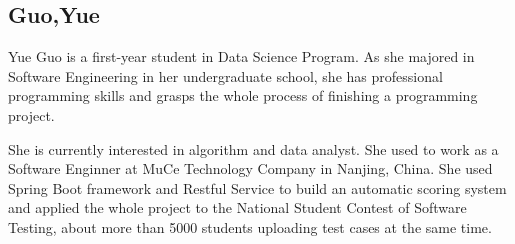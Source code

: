 \subsection{Guo,Yue}
Yue Guo is a first-year student in Data Science Program. As she majored in Software
Engineering in her undergraduate school, she has professional programming skills
and grasps the whole process of finishing a programming project.

She is currently interested in algorithm and data analyst. She used to work as a
Software Enginner at MuCe Technology Company in Nanjing, China. She used Spring
Boot framework and Restful Service to build an automatic scoring system and
applied the whole project to the National Student Contest of Software Testing,
about more than 5000 students uploading test cases at the same time.